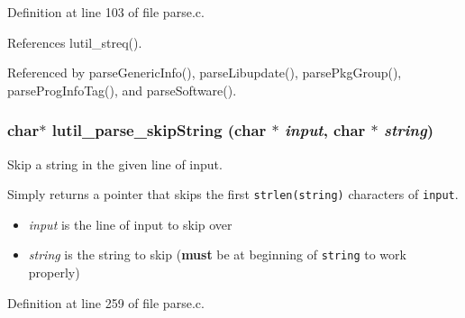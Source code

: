 Definition at line 103 of file parse.c.

References lutil\_\-streq().

Referenced by parse\-Generic\-Info(), parse\-Libupdate(), parse\-Pkg\-Group(), parse\-Prog\-Info\-Tag(), and parse\-Software().
\subsubsection{\setlength{\rightskip}{0pt plus 5cm}char$\ast$ lutil\_\-parse\_\-skip\-String (char $\ast$ {\em input}, char $\ast$ {\em string})}\label{parse_8h_a7}


Skip a string in the given line of input. 

Simply returns a pointer that skips the first {\tt strlen(string)} characters of {\tt input}.

\begin{itemize}
\item {\em input\/} is the line of input to skip over \item {\em string\/} is the string to skip ({\bf must} be at beginning of {\tt string} to work properly) \end{itemize}


Definition at line 259 of file parse.c.